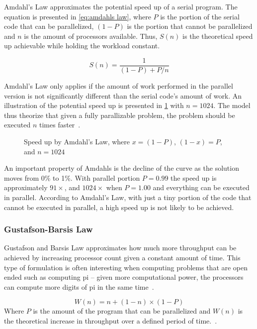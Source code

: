 Amdahl's Law approximates the potential speed up of a serial program.
The equation is presented in \cref{eq:amdahls law}, where $P$ is the portion of the serial code that can be parallelized, $(1-P)$ is the portion that cannot be parallelized and $n$ is the amount of processors available.
Thus, $S(n)$ is the theoretical speed up achievable while holding the workload constant.

\begin{equation}
  \label{eq:amdahls law}
  S(n) = \frac{1}{(1-P) + P/n}
\end{equation}

Amdahl's Law only applies if the amount of work performed in the parallel version is not significantly different than the serial code's amount of work.
An illustration of the potential speed up is presented in \cref{fig:amdahls law} with $n=1024$.
The model thus theorize that given a fully parallizable problem, the problem should be executed $n$ times faster~\cite{farber2011cuda}.

\begin{figure}[htb]
  \centering
  
  \caption{Speed up by Amdahl's Law, where $x=(1-P)$, $(1-x)=P$, and $n=1024$}
  \label{fig:amdahls law}
\end{figure}

An important property of Amdahls is the decline of the curve as the solution moves from 0\% to 1\%.
With parallel portion $P=0.99$ the speed up is approximately $91\times$, and $1024\times$ when $P=1.00$ and everything can be executed in parallel.
According to Amdahl's Law, with just a tiny portion of the code that cannot be executed in parallel, a high speed up is not likely to be achieved.


\subsubsection{Gustafson-Barsis Law}
\label{sec:gustafson-barsis law}

Gustafson and Barsis Law approximates how much more throughput can be achieved by increasing processor count given a constant amount of time.
This type of formulation is often interesting when computing problems that are open ended such as computing pi -- given more computational power, the processors can compute more digits of pi in the same time~\cite{amdahlorgustafson2011}.

\begin{equation}
  \label{eq:gustafson-barsis law}
  W(n) = n + (1-n) \times (1-P)
\end{equation}
Where $P$ is the amount of the program that can be parallelized and $W(n)$ is the theoretical increase in throughput over a defined period of time.~\cite{gustafson1988reevaluating}.

